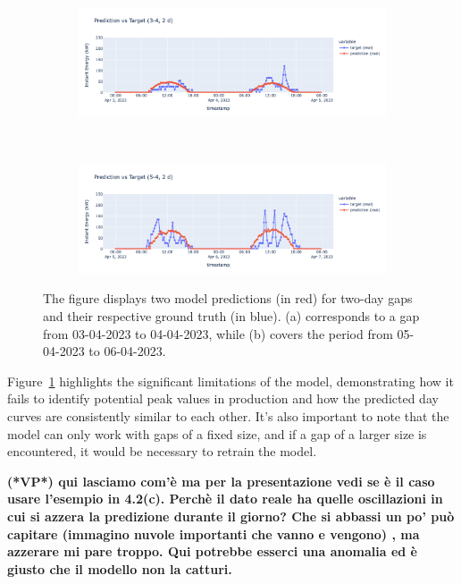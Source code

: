 \begin{figure}[H]
	\centering
	\begin{subfigure}{\textwidth}
		\centering
		\includegraphics[width=.8\textwidth]{chapters/3_models/imgs/ufnc/eval/ufcpred3-4.png}
		\caption{}
	\end{subfigure}\\
	\begin{subfigure}{\textwidth}
		\centering
		\includegraphics[width=.8\textwidth]{chapters/3_models/imgs/ufnc/eval/ufcpred5-4.png}
		\caption{}
	\end{subfigure}
	\caption{The figure displays two model predictions (in red) for two-day gaps and their respective ground truth (in blue). (a) corresponds to a gap from 03-04-2023 to 04-04-2023, while (b) covers the period from 05-04-2023 to 06-04-2023.}
	\label{fig:ufcnevalbrutti}
\end{figure}

Figure~\ref{fig:ufcnevalbrutti} highlights the significant limitations
of the model, demonstrating how it fails to identify potential peak
values in production and how the predicted day curves are consistently similar
to each other.
It's also important to note that the model can only work with
gaps of a fixed size, and if a gap of a larger size is encountered,
it would be necessary to retrain the model.

	{\bf (*VP*) qui lasciamo com'è ma per la presentazione vedi se è il caso usare l'esempio in 4.2(c). Perchè il dato reale ha quelle oscillazioni in cui si azzera la predizione durante il giorno? Che si abbassi un po' può capitare (immagino nuvole importanti che vanno e vengono) , ma azzerare mi pare troppo. Qui potrebbe esserci una anomalia ed è giusto che il modello non la catturi.}

